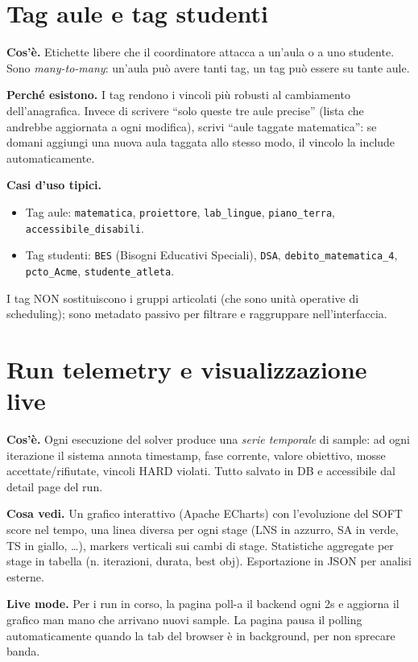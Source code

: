 \section{Tag aule e tag studenti}

\textbf{Cos'\`e.} Etichette libere che il coordinatore attacca
a un'aula o a uno studente. Sono \emph{many-to-many}: un'aula
pu\`o avere tanti tag, un tag pu\`o essere su tante aule.

\textbf{Perch\'e esistono.} I tag rendono i vincoli pi\`u
robusti al cambiamento dell'anagrafica. Invece di scrivere
``solo queste tre aule precise'' (lista che andrebbe
aggiornata a ogni modifica), scrivi ``aule taggate
matematica'': se domani aggiungi una nuova aula taggata
allo stesso modo, il vincolo la include automaticamente.

\textbf{Casi d'uso tipici.}
\begin{itemize}
\item Tag aule: \texttt{matematica}, \texttt{proiettore},
  \texttt{lab\_lingue}, \texttt{piano\_terra},
  \texttt{accessibile\_disabili}.
\item Tag studenti: \texttt{BES} (Bisogni Educativi Speciali),
  \texttt{DSA}, \texttt{debito\_matematica\_4},
  \texttt{pcto\_Acme}, \texttt{studente\_atleta}.
\end{itemize}

I tag NON sostituiscono i gruppi articolati (che sono unit\`a
operative di scheduling); sono metadato passivo per filtrare
e raggruppare nell'interfaccia.

\section{Run telemetry e visualizzazione live}

\textbf{Cos'\`e.} Ogni esecuzione del solver produce una
\emph{serie temporale} di sample: ad ogni iterazione il
sistema annota timestamp, fase corrente, valore obiettivo,
mosse accettate/rifiutate, vincoli HARD violati. Tutto
salvato in DB e accessibile dal detail page del run.

\textbf{Cosa vedi.} Un grafico interattivo (Apache ECharts)
con l'evoluzione del SOFT score nel tempo, una linea diversa
per ogni stage (LNS in azzurro, SA in verde, TS in giallo,
\dots), markers verticali sui cambi di stage. Statistiche
aggregate per stage in tabella (n. iterazioni, durata, best
obj). Esportazione in JSON per analisi esterne.

\textbf{Live mode.} Per i run in corso, la pagina poll-a il
backend ogni 2s e aggiorna il grafico man mano che arrivano
nuovi sample. La pagina pausa il polling automaticamente
quando la tab del browser \`e in background, per non sprecare
banda.

